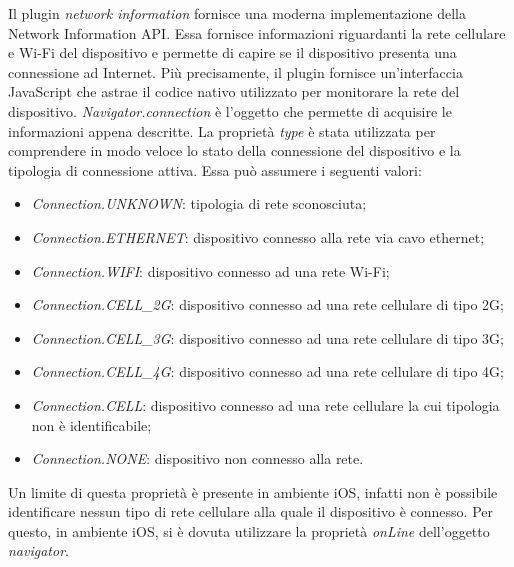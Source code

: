 Il plugin \textit{network information} fornisce una moderna implementazione della Network Information API. Essa fornisce informazioni riguardanti la rete cellulare e Wi-Fi del dispositivo e permette di capire se il dispositivo presenta una connessione ad Internet. Più precisamente, il plugin fornisce un'interfaccia JavaScript che astrae il codice nativo utilizzato per monitorare la rete del dispositivo. \textit{Navigator.connection} è l'oggetto che permette di acquisire le informazioni appena descritte. La proprietà \textit{type} è stata utilizzata per comprendere in modo veloce lo stato della connessione del dispositivo e la tipologia di connessione attiva. Essa può assumere i seguenti valori:
\begin{itemize}
	\item \textit{Connection.UNKNOWN}: tipologia di rete sconosciuta;
	\item \textit{Connection.ETHERNET}: dispositivo connesso alla rete via cavo ethernet;
	\item \textit{Connection.WIFI}: dispositivo connesso ad una rete Wi-Fi;
	\item \textit{Connection.CELL\_2G}: dispositivo connesso ad una rete cellulare di tipo 2G;
	\item \textit{Connection.CELL\_3G}: dispositivo connesso ad una rete cellulare di tipo 3G;
	\item \textit{Connection.CELL\_4G}: dispositivo connesso ad una rete cellulare di tipo 4G;
	\item \textit{Connection.CELL}: dispositivo connesso ad una rete cellulare la cui tipologia non è identificabile;
	\item \textit{Connection.NONE}: dispositivo non connesso alla rete.
\end{itemize}
Un limite di questa proprietà è presente in ambiente iOS, infatti non è possibile identificare nessun tipo di rete cellulare alla quale il dispositivo è connesso. Per questo, in ambiente iOS, si è dovuta utilizzare la proprietà \textit{onLine} dell'oggetto \textit{navigator}.

